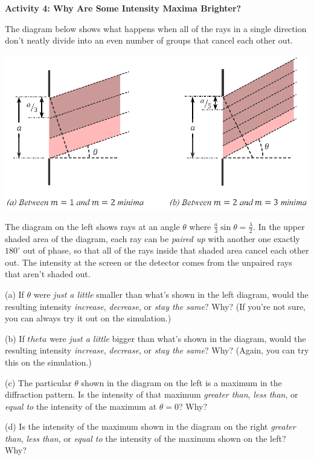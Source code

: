 \textbf{Activity 4: Why Are Some Intensity Maxima Brighter?}

The diagram below shows what happens when all of the rays in a single direction don't neatly divide into an even number of groups that cancel each other out.

{\centering \includegraphics{diffraction_of_light/diffraction_maxima_color.eps} \par}

The diagram on the left shows rays at an angle $\theta$ where $\frac{a}{3} \sin \theta = \frac{\lambda}{2}$.  In the upper shaded area of the diagram, each ray can be \textit{paired up} with another one exactly $180^{\circ}$ out of phase, so that all of the rays inside that shaded area cancel each other out.  The intensity at the screen or the detector  comes from the unpaired rays that aren't shaded out.

(a) If $\theta$ were \textit{just a little} smaller than what's shown in the left diagram, would the resulting intensity \textit{increase}, \textit{decrease}, or \textit{stay the same}?  Why?  (If you're not sure, you can always try it out on the simulation.)
\answerspace{0.4in}

(b) If $theta$ were \textit{just a little} bigger than what's shown in the diagram, would the resulting intensity \textit{increase}, \textit{decrease}, or \textit{stay the same}?  Why?  (Again, you can try this on the simulation.)
\answerspace{0.4in}

(c) The particular $\theta$ shown in the diagram on the left is a maximum in the diffraction pattern.  Is the intensity of that maximum \textit{greater than}, \textit{less than}, or \textit{equal to} the intensity of the maximum at $\theta = 0$?  Why?
\answerspace{0.4in}

\pagebreak[2]
(d) Is the intensity of the maximum shown in the diagram on the right \textit{greater than}, \textit{less than}, or \textit{equal to} the intensity of the maximum shown on the left?  Why?  
\answerspace{0.4in}

